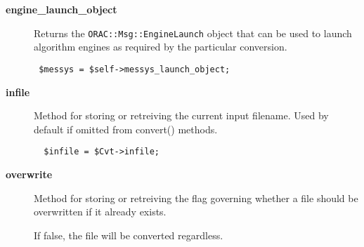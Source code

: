 \begin{description}
\item[\textbf{engine\_launch\_object}] \mbox{}

Returns the \texttt{ORAC::Msg::EngineLaunch} object that can be used
to launch algorithm engines as required by the particular
conversion.

\begin{verbatim}
 $messys = $self->messys_launch_object;
\end{verbatim}
\item[\textbf{infile}] \mbox{}

Method for storing or retreiving the current input filename.
Used by default if omitted from convert() methods.

\begin{verbatim}
  $infile = $Cvt->infile;
\end{verbatim}
\item[\textbf{overwrite}] \mbox{}

Method for storing or retreiving the flag governing whether
a file should be overwritten if it already exists.



If false, the file will be converted regardless.

\end{description}
